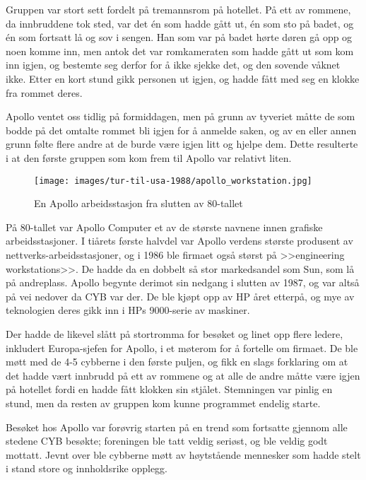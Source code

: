 Gruppen var stort sett fordelt på tremannsrom på hotellet. På ett av rommene, da innbruddene tok sted, var det én som hadde gått ut, én som sto på badet, og én som fortsatt lå og sov i sengen. Han som var på badet hørte døren gå opp og noen komme inn, men antok det var romkameraten som hadde gått ut som kom inn igjen, og bestemte seg derfor for å ikke sjekke det, og den sovende våknet ikke. Etter en kort stund gikk personen ut igjen, og hadde fått med seg en klokke fra rommet deres.

Apollo ventet oss tidlig på formiddagen, men på grunn av tyveriet måtte de som bodde på det omtalte rommet bli igjen for å anmelde saken, og av en eller annen grunn følte flere andre at de burde være igjen litt og hjelpe dem. Dette resulterte i at den første gruppen som kom frem til Apollo var relativt liten.

\begin{wrapfigure}{l}{6.5cm}
	\centering
	\texttt{[image: images/tur-til-usa-1988/apollo\_workstation.jpg]}
	\caption{En Apollo arbeidsstasjon fra slutten av 80-tallet}
\end{wrapfigure}

På 80-tallet var Apollo Computer et av de største navnene innen grafiske arbeidsstasjoner. I tiårets første halvdel var Apollo verdens største produsent av nettverks-arbeidsstasjoner, og i 1986 ble firmaet også størst på >>engineering workstations>>. De hadde da en dobbelt så stor markedsandel som Sun, som lå på andreplass. Apollo begynte derimot sin nedgang i slutten av 1987, og var altså på vei nedover da CYB var der. De ble kjøpt opp av HP året etterpå, og mye av teknologien deres gikk inn i HPs 9000-serie av maskiner.

Der hadde de likevel slått på stortromma for besøket og linet opp flere ledere, inkludert Europa-sjefen for Apollo, i et møterom for å fortelle om firmaet. De ble møtt med de 4-5 cybberne i den første puljen, og fikk en slags forklaring om at det hadde vært innbrudd på ett av rommene og at alle de andre måtte være igjen på hotellet fordi en hadde fått klokken sin stjålet. Stemningen var pinlig en stund, men da resten av gruppen kom kunne programmet endelig starte.

Besøket hos Apollo var forøvrig starten på en trend som fortsatte gjennom alle stedene CYB besøkte; foreningen ble tatt veldig seriøst, og ble veldig godt mottatt. Jevnt over ble cybberne møtt av høytstående mennesker som hadde stelt i stand store og innholdsrike opplegg.

